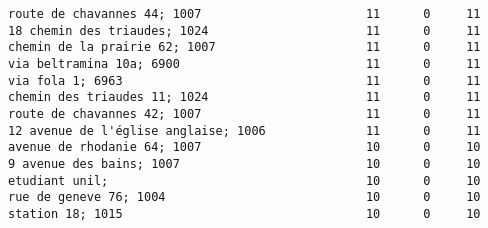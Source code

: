 \documentclass{report}
\begin{document}
\begin{Verbatim}[commandchars=\\\{\}]
route de chavannes 44; 1007                       11      0     11
18 chemin des triaudes; 1024                      11      0     11
chemin de la prairie 62; 1007                     11      0     11
via beltramina 10a; 6900                          11      0     11
via fola 1; 6963                                  11      0     11
chemin des triaudes 11; 1024                      11      0     11
route de chavannes 42; 1007                       11      0     11
12 avenue de l'église anglaise; 1006              11      0     11
avenue de rhodanie 64; 1007                       10      0     10
9 avenue des bains; 1007                          10      0     10
etudiant unil;                                    10      0     10
rue de geneve 76; 1004                            10      0     10
station 18; 1015                                  10      0     10
    \end{Verbatim}





    
    
    
    
\end{document}
